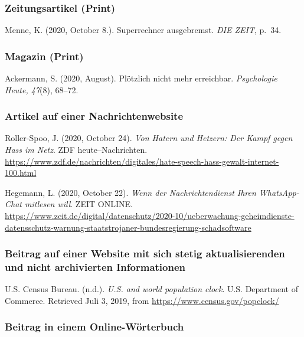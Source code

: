 \documentclass[
  letterpaper,
  DIV=11]{scrreprt}
\begin{document}
\hypertarget{zeitungsartikel-print}{%
\subsubsection{Zeitungsartikel (Print)}\label{zeitungsartikel-print}}

Menne, K. (2020, October 8.). Superrechner ausgebremst. \emph{DIE ZEIT},
p.~34.

\hypertarget{magazin-print}{%
\subsubsection{Magazin (Print)}\label{magazin-print}}

Ackermann, S. (2020, August). Plötzlich nicht mehr erreichbar.
\emph{Psychologie Heute, 47}(8), 68--72.

\hypertarget{artikel-auf-einer-nachrichtenwebsite}{%
\subsubsection{Artikel auf einer
Nachrichtenwebsite}\label{artikel-auf-einer-nachrichtenwebsite}}

Roller-Spoo, J. (2020, October 24). \emph{Von Hatern und Hetzern‎: Der
Kampf gegen Hass im Netz‎}. ZDF heute--Nachrichten.
\url{https://www.zdf.de/nachrichten/digitales/hate-speech-hass-gewalt-internet-100.html}

Hegemann, L. (2020, October 22). \emph{Wenn der Nachrichtendienst Ihren
WhatsApp-Chat mitlesen will}. ZEIT ONLINE.
\url{https://www.zeit.de/digital/datenschutz/2020-10/ueberwachung-geheimdienste-datensschutz-warnung-staatstrojaner-bundesregierung-schadsoftware}

\hypertarget{beitrag-auf-einer-website-mit-sich-stetig-aktualisierenden-und-nicht-archivierten-informationen}{%
\subsubsection{Beitrag auf einer Website mit sich stetig
aktualisierenden und nicht archivierten
Informationen}\label{beitrag-auf-einer-website-mit-sich-stetig-aktualisierenden-und-nicht-archivierten-informationen}}

U.S. Census Bureau. (n.d.). \emph{U.S. and world population clock}. U.S.
Department of Commerce. Retrieved Juli 3, 2019, from
\url{https://www.census.gov/popclock/}

\hypertarget{beitrag-in-einem-online-wuxf6rterbuch}{%
\subsubsection{Beitrag in einem
Online-Wörterbuch}\label{beitrag-in-einem-online-wuxf6rterbuch}}
\end{document}
